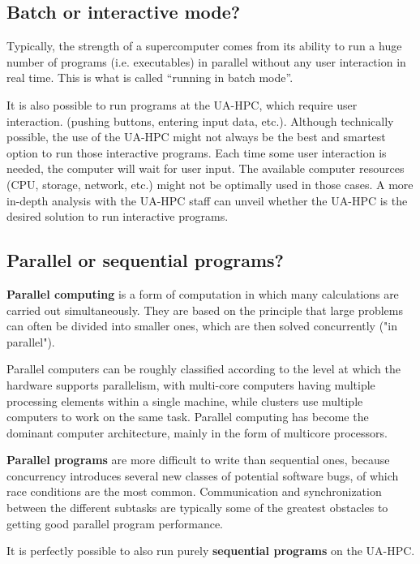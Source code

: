 \subsection{Batch or interactive mode?}
\label{sec:batch-or-interactive-mode}

Typically, the strength of a supercomputer comes from its ability to run a huge
number of programs (i.e. executables) in parallel without any user interaction
in real time. This is what is called ``running in batch mode''.

It is also possible to run programs at the UA-HPC, which require user
interaction. (pushing buttons, entering input data, etc.).  Although
technically possible, the use of the UA-HPC might not always be the best and
smartest option to run those interactive programs.  Each time some user
interaction is needed, the computer will wait for user input. The available
computer resources (CPU, storage, network, etc.) might not be optimally used in
those cases. A more in-depth analysis with the UA-HPC staff can unveil whether
the UA-HPC is the desired solution to run interactive programs.

\subsection{Parallel or sequential programs?}
\label{sec:parallel-or-sequential-programs}

\textbf{Parallel computing} is a form of computation in which many calculations
are carried out simultaneously. They are based on the principle that large
problems can often be divided into smaller ones, which are then solved
concurrently ("in parallel").

Parallel computers can be roughly classified according to the level at which
the hardware supports parallelism, with multi-core computers having multiple
processing elements within a single machine, while clusters use multiple
computers to work on the same task. Parallel computing has become the dominant
computer architecture, mainly in the form of multicore processors.

\textbf{Parallel programs} are more difficult to write than sequential ones,
because concurrency introduces several new classes of potential software bugs,
of which race conditions are the most common. Communication and synchronization
between the different subtasks are typically some of the greatest obstacles to
getting good parallel program performance.

It is perfectly possible to also run purely \textbf{sequential programs} on the
UA-HPC.

